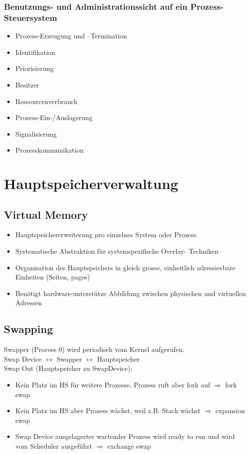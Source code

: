 \documentclass[a4paper, 10pt]{article}
\begin{document}
\subsubsection{Benutzungs- und Administrationssicht auf ein Prozess-Steuersystem}
\begin{itemize}
	\item Prozess-Erzeugung und –Termination
	\item Identifikation
	\item Priorisierung
	\item Besitzer	
	\item Ressourcenverbrauch
	\item Prozess-Ein-/Auslagerung
	\item Signalisierung
	\item Prozesskommunikation
\end{itemize}

\newpage
\section{Hauptspeicherverwaltung}
\subsection{Virtual Memory}
\begin{itemize}
\item Hauptspeichererweiterung pro einzelnes System oder Prozess.
\item Systematische Abstraktion f\"ur systemspezifische Overlay-
Techniken
\item Organisation des Hauptspeichers in gleich grosse,
einheitlich adressierbare Einheiten (Seiten, pages)
\item Ben\"otigt hardware-unterst\"utze Abbildung zwischen
physischen und virtuellen Adressen
\end{itemize}

\subsection{Swapping}
Swapper (Process 0) wird periodisch vom Kernel aufgerufen.\\

Swap Device  $\longleftrightarrow$ Swapper $\longleftrightarrow$ Hauptspeicher\\

Swap Out (Hauptspeicher zu SwapDevice):
\begin{itemize}
\item Kein Platz im HS f\"ur weitere Prozesse, Prozess ruft aber fork auf $\Rightarrow$ fork swap
\item Kein Platz im HS aber Prozess w\"achst, weil z.B. Stack w\"achst $\Rightarrow$ expansion swap
\item Swap Device ausgelagerter wartender Prozess wird ready to run und wird vom Scheduler ausgef\"uhrt $\Rightarrow$ exchange swap
\end{itemize}
\end{document}
